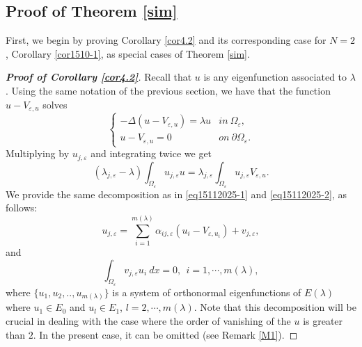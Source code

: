 \documentclass[11pt,reqno]{article}
\numberwithin{equation}{section}
\newcommand\e\varepsilon
\newcommand\la\lambda
\renewcommand\O\Omega
\begin{document}
     
    \subsection{Proof of Theorem \ref{sim}}
    First, we begin by proving  Corollary \ref{cor4.2} and its corresponding case for $N=2$, Corollary \ref{cor1510-1}, as special cases of Theorem \ref{sim}. 
 \begin{proof}[\bf Proof of Corollary \ref{cor4.2}]
        Recall that $u$ is any eigenfunction associated to $\la$. 
		Using the same notation of the previous section, we have that the function $u-V_{\e,u}$ solves
		\begin{equation*}
			\begin{cases}
				-\Delta(u-V_{\e,u})=\lambda u&in\ \O_\e,\\
				u-V_{\e,u}=0&on\ \partial\O_\e.
			\end{cases}
		\end{equation*}
		Multiplying by $u_{j,\e}$ and integrating twice we get
		\begin{equation}\label{2d2}
			(\la_{j,\e}-\la)\int_{\O_\e}u_{j,\e} u=\la_{j,\e}\int_{\O_\e}u_{j,\e}V_{\e,u}.
		\end{equation}
        We provide the same decomposition as in
		  \eqref{eq15112025-1} and \eqref{eq15112025-2}, as follows:
        \begin{equation}\label{2con}
    u_{j,\e}=\sum_{i=1}^{m(\la)}\alpha_{ij,\e} (u_i-V_{\e,u_i})+ v_{j,\e},
\end{equation}
 and
        \begin{equation}
   \int_{\O_\e} v_{j,\e} u_i\ dx= 0,\ \ i=1,\cdots,m(\lambda),
\end{equation}
		where $\{u_1,u_2,..,u_{m(\la)}\}$ is a system of orthonormal eigenfunctions of $E(\la)$ where $u_1\in E_0$ and $u_l\in E_1$, $l=2,\cdots,m(\la)$.
 Note that this decomposition will be crucial in dealing with the case where the order of vanishing of the $u$ is greater than $2$. In the present case, it can be omitted (see Remark \ref{M1}).


\end{proof}
\end{document}
